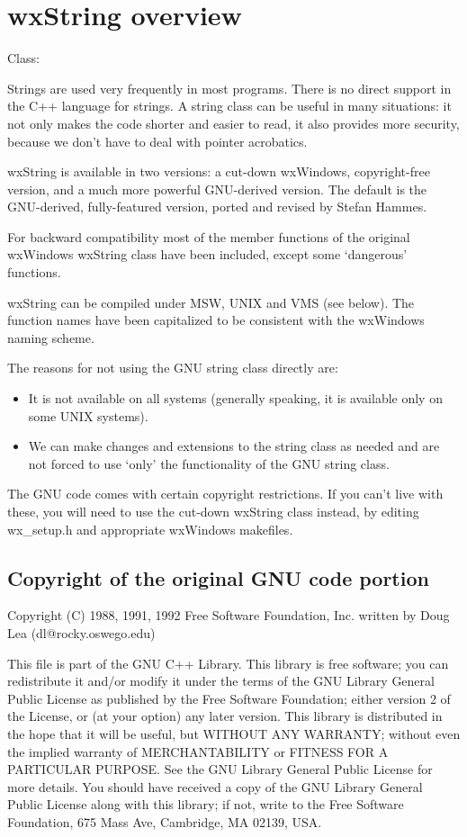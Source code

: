 \section{wxString overview}\label{wxstringoverview}

Class: 

Strings are used very frequently in most programs. There is no direct support in
the C++ language for strings. A string class can be useful in many
situations: it not only makes the code shorter and easier to read, it also
provides more security, because we don't have to deal with pointer acrobatics.

wxString is available in two versions: a cut-down wxWindows,
copyright-free version, and a much more powerful GNU-derived version. The default is the
GNU-derived, fully-featured version, ported and revised by Stefan Hammes.

For backward compatibility most of the member functions of the original
wxWindows wxString class have been included, except some `dangerous'
functions.

wxString can be compiled under MSW, UNIX and VMS (see below). The
function names have been capitalized to be consistent with the wxWindows
naming scheme.

The reasons for not using the GNU string class directly are:

\begin{itemize}\itemsep=0pt
\item It is not available on all systems (generally speaking, it is available only on some 
UNIX systems).
\item We can make changes and extensions to the string class as needed and are not
forced to use `only' the functionality of the GNU string class.
\end{itemize}

The GNU code comes with certain copyright restrictions. If you can't
live with these, you will need to use the cut-down wxString class
instead, by editing wx\_setup.h and appropriate wxWindows makefiles.

\subsection{Copyright of the original GNU code portion}

Copyright (C) 1988, 1991, 1992 Free Software Foundation, Inc.
written by Doug Lea (dl@rocky.oswego.edu)

This file is part of the GNU C++ Library. This library is free
software; you can redistribute it and/or modify it under the terms of
the GNU Library General Public License as published by the Free
Software Foundation; either version 2 of the License, or (at your
option) any later version. This library is distributed in the hope
that it will be useful, but WITHOUT ANY WARRANTY; without even the
implied warranty of MERCHANTABILITY or FITNESS FOR A PARTICULAR
PURPOSE. See the GNU Library General Public License for more details.
You should have received a copy of the GNU Library General Public
License along with this library; if not, write to the Free Software
Foundation, 675 Mass Ave, Cambridge, MA 02139, USA.

